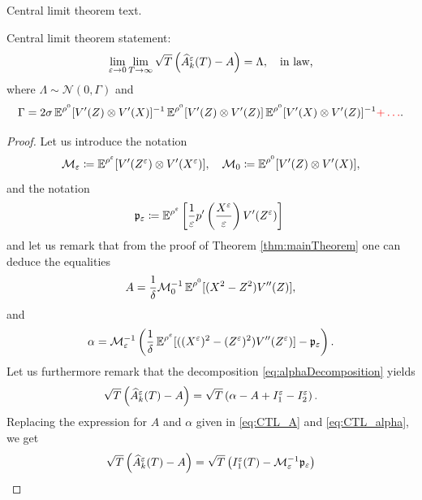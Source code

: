 \documentclass[10pt]{article}
\begin{document}
Central limit theorem text.
\begin{theorem}\label{thm:CLT} Central limit theorem statement:
	\begin{equation}
		\lim_{\varepsilon \to 0}\lim_{T \to \infty} \sqrt{T}\left(\widehat A^\varepsilon_k(T) - A\right) = \Lambda, \quad \text{in law,}
	\end{equation}
	where $\Lambda \sim \mathcal N(0, \Gamma)$ and 
	\begin{equation}
		\Gamma = 2\sigma \operatorname{\mathbb{E}}^{\rho^0}[V'(Z) \otimes V'(X)]^{-1}\operatorname{\mathbb{E}}^{\rho^0}[V'(Z) \otimes V'(Z)]\operatorname{\mathbb{E}}^{\rho^0}[V'(X) \otimes V'(Z)]^{-1} {\color{red}+ \dots}.
	\end{equation}
\end{theorem}

\begin{proof} Let us introduce the notation
	\begin{equation}
		\mathcal M_\varepsilon \coloneqq \operatorname{\mathbb{E}}^{\rho^\varepsilon} [ V'(Z^\varepsilon) \otimes V'(X^\varepsilon) ], \quad \mathcal M_0 \coloneqq \operatorname{\mathbb{E}}^{\rho^0} [ V'(Z) \otimes V'(X) ],
	\end{equation}
	and the notation
	\begin{equation}
		\mathfrak p_\varepsilon \coloneqq \operatorname{\mathbb{E}}^{\rho^\varepsilon} \left [ \frac{1}{\varepsilon} p' \left ( \frac{X^\varepsilon}{\varepsilon} \right ) V'(Z^\varepsilon) \right ]\
	\end{equation}
	and let us remark that from the proof of Theorem \ref{thm:mainTheorem} one can deduce the equalities
	\begin{equation}\label{eq:CTL_A}
		A = \frac1\delta \mathcal M_0^{-1} \operatorname{\mathbb{E}}^{\rho^0}[(X^2 - Z^2)V''(Z)],
	\end{equation}
	and
	\begin{equation}\label{eq:CTL_alpha}
		\alpha = \mathcal M_\varepsilon^{-1} \left(\frac1\delta \operatorname{\mathbb{E}}^{\rho^\varepsilon}[((X^\varepsilon)^2 - (Z^\varepsilon)^2)V''(Z^\varepsilon)] - \mathfrak p_\varepsilon \right).
	\end{equation}
	Let us furthermore remark that the decomposition \eqref{eq:alphaDecomposition} yields
	\begin{equation}
		\sqrt{T}\left(\widehat A^\varepsilon_k(T) - A\right) = \sqrt{T} \left(\alpha - A + I_1^\varepsilon - I_2^\varepsilon\right).
	\end{equation}
	Replacing the expression for $A$ and $\alpha$ given in \eqref{eq:CTL_A} and \eqref{eq:CTL_alpha}, we get
	\begin{equation}
	\begin{aligned}
	\sqrt{T}\left(\widehat A^\epl_k(T) - A\right) &= \sqrt{T}\left( I_1^\epl(T) - \mathcal M_\epl^{-1} \mathfrak p_\epl \right) \\

\end{aligned}
\end{equation}
\end{proof}
\end{document}
